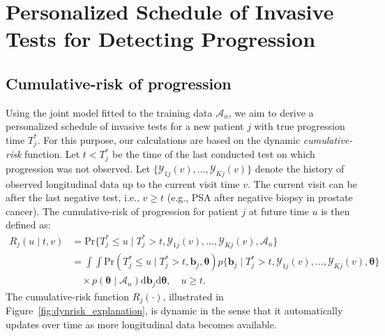 \section{Personalized Schedule of Invasive Tests for Detecting Progression} 
\label{sec:schedule}

\subsection{Cumulative-risk of progression} 
\label{subsec:cum_risk}
Using the joint model fitted to the training data $\mathcal{A}_n$, we aim to derive a personalized schedule of invasive tests for a new patient $j$ with true progression time $T^*_j$. For this purpose, our calculations are based on the dynamic \emph{cumulative-risk} function. Let $t < T^*_j$ be the time of the last conducted test on which progression was not observed. Let $\{\mathcal{Y}_{1j}(v), \ldots, \mathcal{Y}_{Kj}(v)\}$ denote the history of observed longitudinal data up to the current visit time $v$. The current visit can be after the last negative test, i.e., $v \geq t$ (e.g., PSA after negative biopsy in prostate cancer). The cumulative-risk of progression for patient $j$ at future time $u$ is then defined as:
\begin{equation}
\label{eq:cumulative_risk}
\begin{split}
R_j(u \mid t, v) &= \mbox{Pr}\big\{T^*_j \leq u \mid T^*_j > t, \mathcal{Y}_{1j}(v), \ldots, \mathcal{Y}_{Kj}(v), \mathcal{A}_n\big\}\\
&=\int \int \mbox{Pr}(T^*_j \leq u \mid T^*_j > t, \boldsymbol{b}_{j}, \boldsymbol{\theta}) p\big\{\boldsymbol{b}_j \mid T^*_j > t, \mathcal{Y}_{1j}(v), \ldots, \mathcal{Y}_{Kj}(v), \boldsymbol{\theta} \big\}\\
&\quad \times p(\boldsymbol{\theta} \mid \mathcal{A}_n) \mathrm{d}\boldsymbol{b}_j \mathrm{d}\boldsymbol{\theta}, \quad u \geq t.
\end{split}
\end{equation}
The cumulative-risk function $R_j(\cdot)$, illustrated in Figure~\ref{fig:dynrisk_explanation}, is dynamic in the sense that it automatically updates over time as more longitudinal data becomes available.
